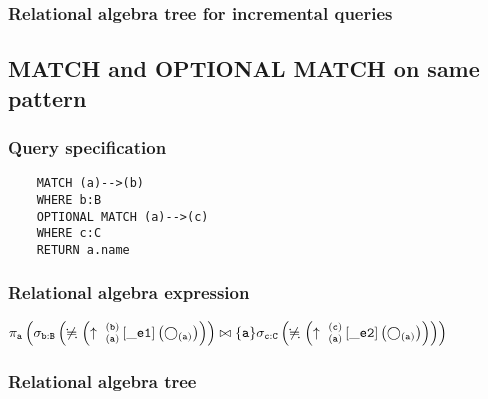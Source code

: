	\subsubsection*{Relational algebra tree for incremental queries}

	\subsection{MATCH and OPTIONAL MATCH on same pattern}

	\subsubsection*{Query specification}

	\begin{lstlisting}
	MATCH (a)-->(b)
	WHERE b:B
	OPTIONAL MATCH (a)-->(c)
	WHERE c:C
	RETURN a.name
	\end{lstlisting}


	\subsubsection*{Relational algebra expression}

	$\projection{\var{a}} \left(\selection{\mathtt{b:B}} \left(\alldifferent{} \left(\expandout{a}{b}{}{\_e1}{} \left(\getvertices{a}{}\right)\right)\right) \join \{\var{a}\} \selection{\mathtt{c:C}} \left(\alldifferent{} \left(\expandout{a}{c}{}{\_e2}{} \left(\getvertices{a}{}\right)\right)\right)\right)$

	\subsubsection*{Relational algebra tree}

